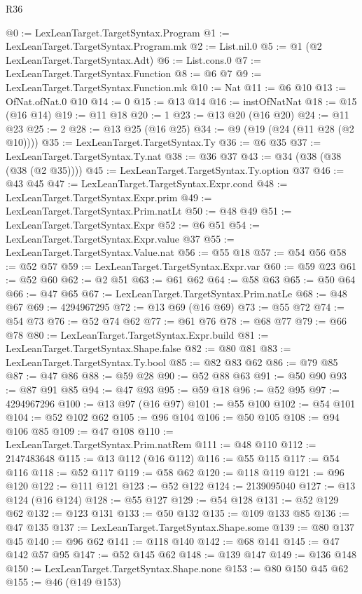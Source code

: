 \begin{lexlean}{R36}
\begin{coremodule}
@0 := LexLeanTarget.TargetSyntax.Program
@1 := LexLeanTarget.TargetSyntax.Program.mk
@2 := List.nil.{0}
@5 := @1 (@2 LexLeanTarget.TargetSyntax.Adt)
@6 := List.cons.{0}
@7 := LexLeanTarget.TargetSyntax.Function
@8 := @6 @7
@9 := LexLeanTarget.TargetSyntax.Function.mk
@10 := Nat
@11 := @6 @10
@13 := OfNat.ofNat.{0} @10
@14 := 0
@15 := @13 @14
@16 := instOfNatNat
@18 := @15 (@16 @14)
@19 := @11 @18
@20 := 1
@23 := @13 @20 (@16 @20)
@24 := @11 @23
@25 := 2
@28 := @13 @25 (@16 @25)
@34 := @9 (@19 (@24 (@11 @28 (@2 @10))))
@35 := LexLeanTarget.TargetSyntax.Ty
@36 := @6 @35
@37 := LexLeanTarget.TargetSyntax.Ty.nat
@38 := @36 @37
@43 := @34 (@38 (@38 (@38 (@2 @35))))
@45 := LexLeanTarget.TargetSyntax.Ty.option @37
@46 := @43 @45
@47 := LexLeanTarget.TargetSyntax.Expr.cond
@48 := LexLeanTarget.TargetSyntax.Expr.prim
@49 := LexLeanTarget.TargetSyntax.Prim.natLt
@50 := @48 @49
@51 := LexLeanTarget.TargetSyntax.Expr
@52 := @6 @51
@54 := LexLeanTarget.TargetSyntax.Expr.value @37
@55 := LexLeanTarget.TargetSyntax.Value.nat
@56 := @55 @18
@57 := @54 @56
@58 := @52 @57
@59 := LexLeanTarget.TargetSyntax.Expr.var
@60 := @59 @23
@61 := @52 @60
@62 := @2 @51
@63 := @61 @62
@64 := @58 @63
@65 := @50 @64
@66 := @47 @65
@67 := LexLeanTarget.TargetSyntax.Prim.natLe
@68 := @48 @67
@69 := 4294967295
@72 := @13 @69 (@16 @69)
@73 := @55 @72
@74 := @54 @73
@76 := @52 @74 @62
@77 := @61 @76
@78 := @68 @77
@79 := @66 @78
@80 := LexLeanTarget.TargetSyntax.Expr.build
@81 := LexLeanTarget.TargetSyntax.Shape.false
@82 := @80 @81
@83 := LexLeanTarget.TargetSyntax.Ty.bool
@85 := @82 @83 @62
@86 := @79 @85
@87 := @47 @86
@88 := @59 @28
@90 := @52 @88 @63
@91 := @50 @90
@93 := @87 @91 @85
@94 := @47 @93
@95 := @59 @18
@96 := @52 @95
@97 := 4294967296
@100 := @13 @97 (@16 @97)
@101 := @55 @100
@102 := @54 @101
@104 := @52 @102 @62
@105 := @96 @104
@106 := @50 @105
@108 := @94 @106 @85
@109 := @47 @108
@110 := LexLeanTarget.TargetSyntax.Prim.natRem
@111 := @48 @110
@112 := 2147483648
@115 := @13 @112 (@16 @112)
@116 := @55 @115
@117 := @54 @116
@118 := @52 @117
@119 := @58 @62
@120 := @118 @119
@121 := @96 @120
@122 := @111 @121
@123 := @52 @122
@124 := 2139095040
@127 := @13 @124 (@16 @124)
@128 := @55 @127
@129 := @54 @128
@131 := @52 @129 @62
@132 := @123 @131
@133 := @50 @132
@135 := @109 @133 @85
@136 := @47 @135
@137 := LexLeanTarget.TargetSyntax.Shape.some
@139 := @80 @137 @45
@140 := @96 @62
@141 := @118 @140
@142 := @68 @141
@145 := @47 @142 @57 @95
@147 := @52 @145 @62
@148 := @139 @147
@149 := @136 @148
@150 := LexLeanTarget.TargetSyntax.Shape.none
@153 := @80 @150 @45 @62
@155 := @46 (@149 @153)

\end{coremodule}
\end{lexlean}
